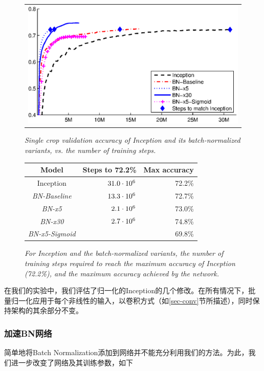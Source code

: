 \documentclass[twocolumn]{article}
\begin{document}
\begin{figure}
\centering
\begin{minipage}[b]{\columnwidth}
\begin{tabular}{@{}c@{}}
\includegraphics[width=\columnwidth]{inception-compare.eps}
\end{tabular} 
\caption{\em Single crop validation accuracy of Inception and its
  batch-normalized variants, vs. the number of training steps.  }
\label{fig-inception}
\end{minipage}
\qquad
%
\begin{minipage}[b]{0.9\columnwidth}
\begin{tabular}{@{} c | r  r  @{}}
\hline
Model & Steps to  72.2\% & Max accuracy \\ 
\hline
Inception& $31.0\cdot 10^6$ & 72.2\%  \\
\sl BN-Baseline& $13.3\cdot 10^6$ & 72.7\%  \\
\sl BN-x5& $2.1\cdot 10^6$ & 73.0\%  \\
\sl BN-x30& $2.7\cdot 10^6$ & 74.8\% \\
\sl BN-x5-Sigmoid&  & 69.8\%\\\hline
\end{tabular}
\caption{\em For Inception and the batch-normalized variants, the number of training steps required to reach the maximum accuracy of Inception (72.2\%), and the maximum accuracy achieved by the network.}
\label{fig-stats}
\end{minipage}
\end{figure}

在我们的实验中，我们评估了归一化的Inception的几个修改。在所有情况下，批量归一化应用于每个非线性的输入，以卷积方式（如\ref{sec-conv}节所描述），同时保持架构的其余部分不变。

\subsubsection{加速BN网络}
\label{sec-accelerating}
简单地将Batch Normalization添加到网络并不能充分利用我们的方法。为此，我们进一步改变了网络及其训练参数，如下
\end{document}
